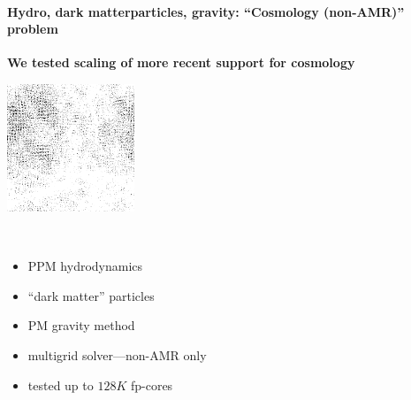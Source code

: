 
\begin{frame}[fragile]
 \secframetitle{\ssScaling}
\framesubtitle{Hydro, dark matterparticles, gravity: ``Cosmology (non-AMR)'' problem}

\textbf{We tested scaling of more recent support for cosmology}

\begin{minipage}{1.5in}
  \vspace{0.2in}
  \includegraphics[width=1.5in]{Images/Cosmo/dark-20-normal.png} \\
\end{minipage} \
\begin{minipage}{2.75in}
  \vspace {0.2in}
  \begin{itemize}
  \item PPM hydrodynamics
  \item ``dark matter'' particles
  \item PM gravity method
  \item multigrid solver---non-AMR only
   \item tested up to $128K$ fp-cores
  \end{itemize}
\end{minipage}
\end{frame}
